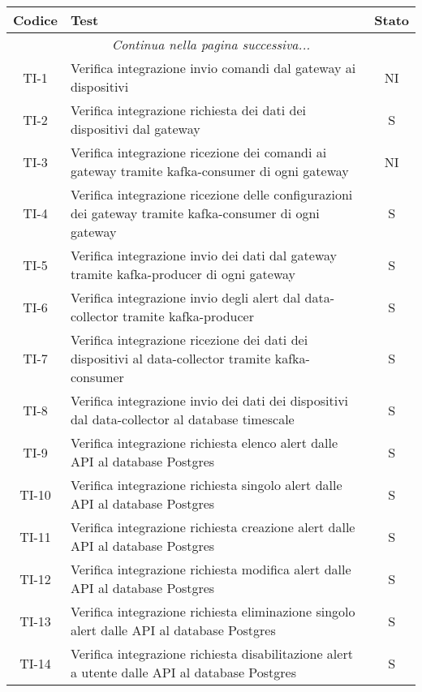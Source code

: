 		\begin{center}
			\begin{longtable}{|c|p{12cm}|c|}
			\hline
			\rowcolor{lighter-grayer}
			\textbf{Codice} & \textbf{Test} & \textbf{Stato}  \\ %
			\hline
			\endhead
			\hline
	        \multicolumn{3}{|c|}{\textit{Continua nella pagina successiva...}}\\
	        \hline
	        \endfoot
	        \endlastfoot

			\hline
			TI-1 & Verifica integrazione invio comandi dal gateway ai dispositivi & NI \\
			\hline
			TI-2 & Verifica integrazione richiesta dei dati dei dispositivi dal gateway & S \\
			\hline
			TI-3 & Verifica integrazione ricezione dei comandi ai gateway tramite kafka-consumer di ogni gateway & NI \\
			\hline
			TI-4 & Verifica integrazione ricezione delle configurazioni dei gateway tramite kafka-consumer di ogni gateway & S \\
			\hline
			TI-5 & Verifica integrazione invio dei dati dal gateway tramite kafka-producer di ogni gateway & S \\
			\hline
			TI-6 & Verifica integrazione invio degli alert dal data-collector tramite kafka-producer & S \\
			\hline
			TI-7 & Verifica integrazione ricezione dei dati dei dispositivi al data-collector tramite kafka-consumer & S \\
			\hline
			TI-8 & Verifica integrazione invio dei dati dei dispositivi dal data-collector al database timescale & S \\
			\hline
			TI-9 & Verifica integrazione richiesta elenco alert dalle API al database Postgres & S \\
			\hline
			TI-10 & Verifica integrazione richiesta singolo alert dalle API al database Postgres & S \\
			\hline
			TI-11 & Verifica integrazione richiesta creazione alert dalle API al database Postgres & S \\
			\hline
			TI-12 & Verifica integrazione richiesta modifica alert dalle API al database Postgres & S \\
			\hline
			TI-13 & Verifica integrazione richiesta eliminazione singolo alert dalle API al database Postgres & S \\
			\hline
			TI-14 & Verifica integrazione richiesta disabilitazione alert a utente dalle API al database Postgres & S \\

\end{longtable}
\end{center}
